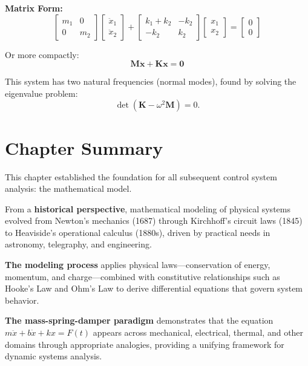 \textbf{Matrix Form:}
\begin{equation}
\begin{bmatrix} m_1 & 0 \\ 0 & m_2 \end{bmatrix}
\begin{bmatrix} \ddot{x}_1 \\ \ddot{x}_2 \end{bmatrix} +
\begin{bmatrix} k_1 + k_2 & -k_2 \\ -k_2 & k_2 \end{bmatrix}
\begin{bmatrix} x_1 \\ x_2 \end{bmatrix} =
\begin{bmatrix} 0 \\ 0 \end{bmatrix}
\end{equation}

Or more compactly:
\begin{equation}
\boxed{\mathbf{M}\ddot{\mathbf{x}} + \mathbf{K}\mathbf{x} = \mathbf{0}}
\end{equation}

This system has two natural frequencies (normal modes), found by solving the eigenvalue problem:
\begin{equation}
\det(\mathbf{K} - \omega^2\mathbf{M}) = 0.
\end{equation}


\section{Chapter Summary}

This chapter established the foundation for all subsequent control system analysis: the mathematical model.

From a \textbf{historical perspective}, mathematical modeling of physical systems evolved from Newton's mechanics (1687) through Kirchhoff's circuit laws (1845) to Heaviside's operational calculus (1880s), driven by practical needs in astronomy, telegraphy, and engineering.

\textbf{The modeling process} applies physical laws---conservation of energy, momentum, and charge---combined with constitutive relationships such as Hooke's Law and Ohm's Law to derive differential equations that govern system behavior.

\textbf{The mass-spring-damper paradigm} demonstrates that the equation $m\ddot{x} + b\dot{x} + kx = F(t)$ appears across mechanical, electrical, thermal, and other domains through appropriate analogies, providing a unifying framework for dynamic systems analysis.

